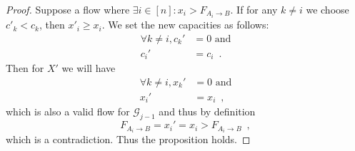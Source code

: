 \begin{proof}
  Suppose a flow where $\exists i \in [n] : x_i > F_{A_i \rightarrow B}$. If for any $k \neq i$ we choose $c'_k < c_k$, then
  $x'_i \geq x_i$. We set the new capacities as follows:
  \begin{align*}
    \forall k \neq i, c_k' &= 0 \mbox{ and} \\
    c_i' &= c_i \enspace.
  \end{align*}
  Then for $X'$ we will have
  \begin{align*}
    \forall k \neq i, x_k' &= 0 \mbox{ and} \\
    x_i' &= x_i \enspace,
  \end{align*}
  which is also a valid flow for $\mathcal{G}_{j-1}$ and thus by definition
  \begin{equation*}
    F_{A_i \rightarrow B} = x_i' = x_i > F_{A_i \rightarrow B} \enspace,
  \end{equation*}
  which is a contradiction. Thus the proposition holds.
\end{proof}
